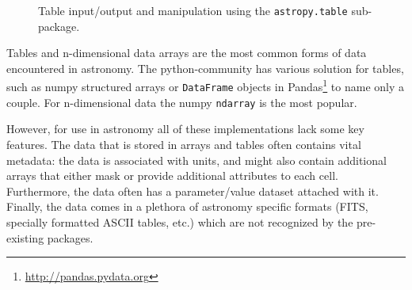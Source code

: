 \documentclass[traditabstract]{aa}
\begin{document}
\begin{figure}
\center
\caption{Table input/output and manipulation using the \texttt{astropy.table}
sub-package.\label{code:tables}}
\vspace{0.1in}
\end{figure}

Tables and n-dimensional data arrays are the most common forms of data
encountered in astronomy. The \gls{python}-community has various solution for
tables, such as \gls{numpy} structured arrays or \texttt{DataFrame} objects in
Pandas\footnote{\url{http://pandas.pydata.org}} to name only a couple. For
n-dimensional data the \gls{numpy} \texttt{ndarray} is the most popular.

However, for use in astronomy all of these implementations lack some key
features. The data that is stored in arrays and tables often contains vital
metadata: the data is associated with units, and might also contain additional
arrays that either mask or provide additional attributes to each cell.
Furthermore, the data often has a parameter/value dataset attached with it.
Finally, the data comes in a plethora of astronomy specific formats (FITS,
specially formatted ASCII tables, etc.) which are not recognized by the
pre-existing packages.
\end{document}
